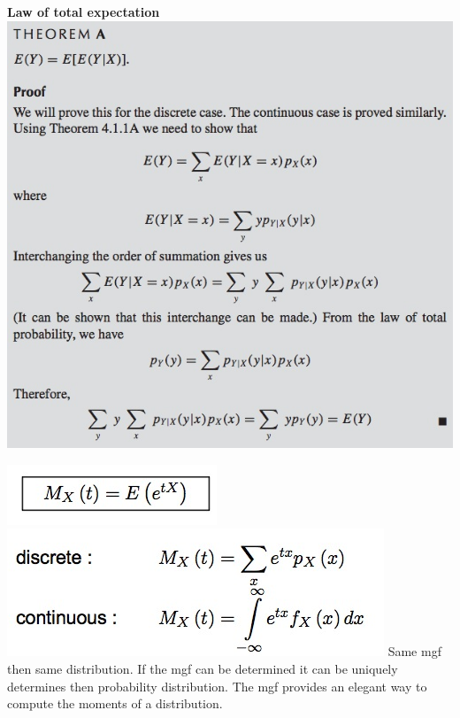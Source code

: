 \documentclass{/out/app/latex/examnotes}
\begin{document}
{{\bf Law of total expectation}
\includegraphics[scale=0.5]{./img/44A.jpg}


\includegraphics[scale=0.5]{./img/451.jpg}
\includegraphics[scale=0.5]{./img/452.jpg}
\ra Same mgf then same distribution.
\ra If the mgf can be determined it can be uniquely determines then probability distribution. 
\ra The mgf provides an elegant way to compute the moments of a distribution.

}
\end{document}
